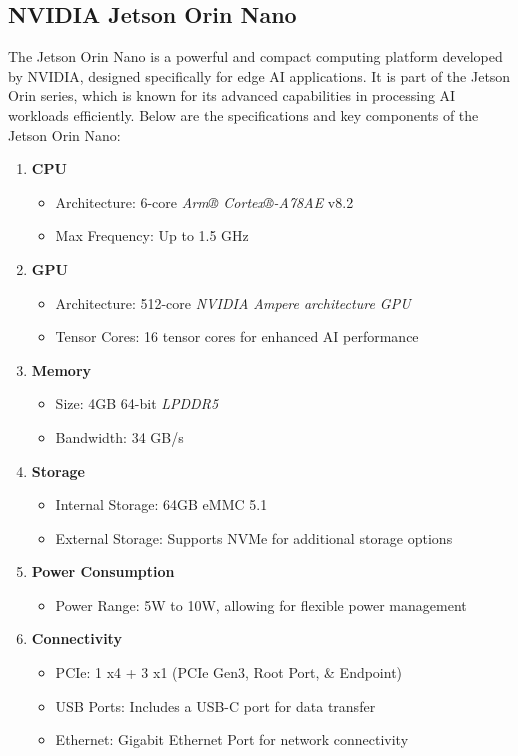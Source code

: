 \subsection{\fontsize{14}{16} NVIDIA Jetson Orin Nano}
{
	\fontsize{12}{14}
	The Jetson Orin Nano is a powerful and compact computing platform developed by NVIDIA, designed specifically for edge AI applications. It is part of the Jetson Orin series, which is known for its advanced capabilities in processing AI workloads efficiently. Below
	are the specifications and key components of the Jetson Orin Nano:
	\begin{enumerate}
		\item \textbf{CPU}
		\begin{itemize}
			\item Architecture: 6-core \textit{Arm® Cortex®-A78AE} v8.2
			\item Max Frequency: Up to 1.5 GHz
		\end{itemize}
		
		\item \textbf{GPU}
		\begin{itemize}
			\item Architecture: 512-core \textit{NVIDIA Ampere architecture GPU}
			\item Tensor Cores: 16 tensor cores for enhanced AI performance
		\end{itemize}
		
		\item \textbf{Memory}
		\begin{itemize}
			\item Size: 4GB 64-bit \textit{LPDDR5}
			\item Bandwidth: 34 GB/s
		\end{itemize}
		
		\item \textbf{Storage}
		\begin{itemize}
			\item Internal Storage: 64GB eMMC 5.1
			\item External Storage: Supports NVMe for additional storage options
		\end{itemize}
		
		\item \textbf{Power Consumption}
		\begin{itemize}
			\item Power Range: 5W to 10W, allowing for flexible power management
		\end{itemize}
		
		\item \textbf{Connectivity}
		\begin{itemize}
			\item PCIe: 1 x4 + 3 x1 (PCIe Gen3, Root Port, \& Endpoint)
			\item USB Ports: Includes a USB-C port for data transfer
			\item Ethernet: Gigabit Ethernet Port for network connectivity
		\end{itemize}
		

\end{enumerate}}
